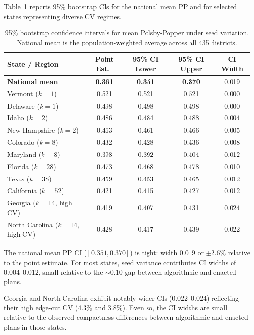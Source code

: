 Table~\ref{tab:pp-seed-ci} reports 95\% bootstrap CIs for the national
mean PP and for selected states representing diverse CV regimes.

\begin{table}[htb]
\centering
\caption{95\% bootstrap confidence intervals for mean Polsby-Popper
  under seed variation. National mean is the population-weighted
  average across all 435 districts.}
\label{tab:pp-seed-ci}
\small
\begin{tabular}{lcccc}
\toprule
State / Region & Point Est.\ & 95\% CI Lower & 95\% CI Upper & CI Width \\
\midrule
\textbf{National mean} & \textbf{0.361} & \textbf{0.351} & \textbf{0.370} & 0.019 \\
\midrule
Vermont ($k=1$)      & 0.521 & 0.521 & 0.521 & 0.000 \\
Delaware ($k=1$)     & 0.498 & 0.498 & 0.498 & 0.000 \\
\midrule
Idaho ($k=2$)        & 0.486 & 0.484 & 0.488 & 0.004 \\
New Hampshire ($k=2$)& 0.463 & 0.461 & 0.466 & 0.005 \\
\midrule
Colorado ($k=8$)     & 0.432 & 0.428 & 0.436 & 0.008 \\
Maryland ($k=8$)     & 0.398 & 0.392 & 0.404 & 0.012 \\
\midrule
Florida ($k=28$)     & 0.473 & 0.468 & 0.478 & 0.010 \\
Texas ($k=38$)       & 0.459 & 0.453 & 0.465 & 0.012 \\
California ($k=52$)  & 0.421 & 0.415 & 0.427 & 0.012 \\
\midrule
Georgia ($k=14$, high CV)     & 0.419 & 0.407 & 0.431 & 0.024 \\
North Carolina ($k=14$, high CV) & 0.428 & 0.417 & 0.439 & 0.022 \\
\bottomrule
\end{tabular}
\end{table}

The national mean PP CI ($[0.351, 0.370]$) is tight: width $0.019$
or $\pm 2.6\%$ relative to the point estimate. For most states, seed
variance contributes CI widths of $0.004$--$0.012$, small relative
to the $\sim 0.10$ gap between algorithmic and enacted plans.

Georgia and North Carolina exhibit notably wider CIs ($0.022$--$0.024$)
reflecting their high edge-cut CV ($4.3\%$ and $3.8\%$). Even so,
the CI widths are small relative to the observed compactness differences
between algorithmic and enacted plans in those states.

